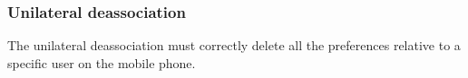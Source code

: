 \subsubsection{Unilateral deassociation} 
\small{The unilateral deassociation must correctly delete all the preferences relative to a specific user on the mobile phone.}
